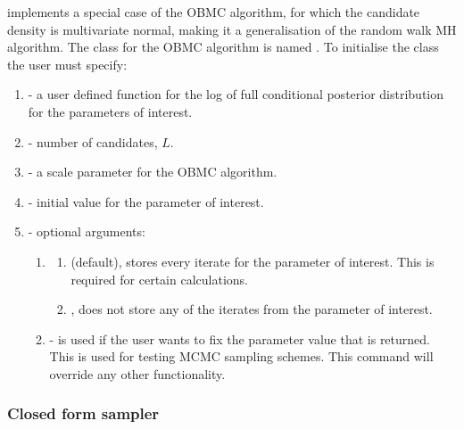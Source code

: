 \documentclass[article]{jss}
\begin{document}
 implements a special case of the OBMC algorithm, for
which the candidate density is multivariate normal, making it a
generalisation of the random walk MH algorithm. The class for the OBMC
algorithm is named . To initialise the class the user must
specify:
\begin{enumerate}
\item {} - a user defined function for the log of full conditional
  posterior distribution for the parameters of interest.
\item {} - number of candidates, $L$.
\item {} - a scale parameter for the OBMC algorithm.
\item {} - initial value for the parameter of interest. 
\item {} - optional arguments:

  \begin{enumerate}
  \item {}
    \begin{enumerate}
      \item {} (default), stores every iterate for the parameter
        of interest. This is required for certain calculations.
      \item {}, does not store any of the iterates from the parameter of interest. 
      \end{enumerate}
  \item {} - is used if the user wants to fix the
    parameter value that is returned. This is used for testing MCMC
    sampling schemes.  This command will override any other
    functionality.
  \end{enumerate}
\end{enumerate}

\subsubsection{Closed form sampler}
\end{document}
